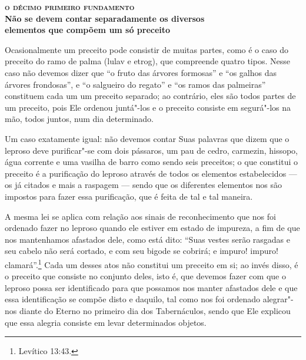 \bigskip

\noindent\textbf{\textsc{o décimo primeiro fundamento}\\Não se devem contar separadamente os diversos\\ elementos que compõem um só preceito}

\smallskip

Ocasionalmente um preceito pode consistir de muitas partes, como é o
caso do preceito do ramo de palma (lulav\starr{} e etrog\starr), que
compreende quatro tipos. Nesse caso não devemos dizer que ``o fruto das
árvores formosas'' e ``os galhos das árvores frondosas'', e ``o
salgueiro do regato'' e ``os ramos das palmeiras'' constituem cada um
um preceito separado; ao contrário, eles são todos partes de um
preceito, pois Ele ordenou juntá"-los e o preceito consiste em segurá"-los
na mão, todos juntos, num dia determinado.

Um caso exatamente igual: não devemos contar Suas palavras que dizem que
o leproso deve purificar"-se com dois pássaros, um pau de cedro,
carmezin, hissopo, água corrente e uma vasilha de barro como sendo seis
preceitos; o que constitui o preceito é a purificação do leproso
através de todos os elementos estabelecidos --- os já citados e mais a
raspagem --- sendo que os diferentes elementos nos são impostos para
fazer essa purificação, que é feita de tal e tal maneira.

A mesma lei se aplica com relação aos sinais de reconhecimento que nos
foi ordenado fazer no leproso quando ele estiver em estado de impureza,
a fim de que nos mantenhamos afastados dele, como está dito: ``Suas
vestes serão rasgadas e seu cabelo não será cortado, e com seu bigode se
cobrirá; e impuro! impuro! clamará''.\footnote{Levítico 13:43.} Cada um desses
atos não constitui um preceito em si; ao invés disso, é o preceito que
consiste no conjunto deles,
isto é, que devemos fazer com que o leproso possa ser identificado para
que possamos nos manter afastados dele e que essa identificação se
compõe disto e daquilo, tal como nos foi ordenado alegrar"-nos diante do
Eterno no primeiro dia dos Tabernáculos, sendo que Ele explicou que essa
alegria consiste em levar determinados objetos.

